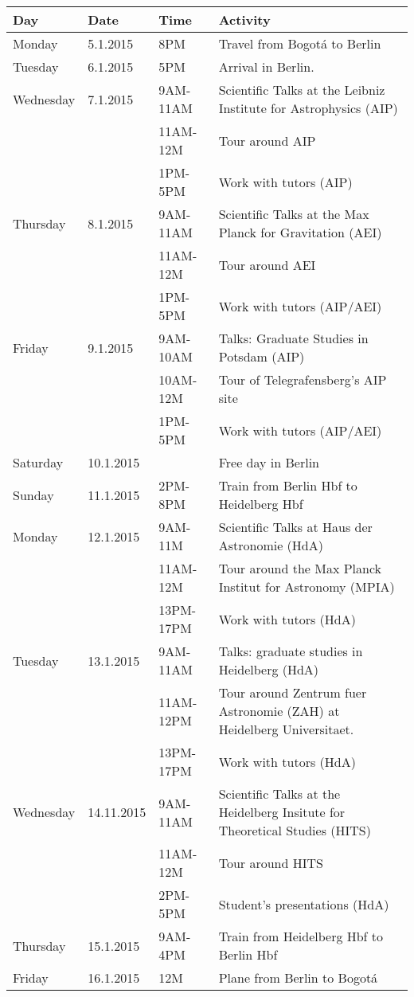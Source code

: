 \documentclass[12pt]{article}
\begin{document}
\begin{tabular}{p{2cm}p{2cm}p{2.5cm}p{7.0cm}}
Day & Date & Time & Activity\\\hline\hline

Monday & 5.1.2015 & 8PM&	Travel from Bogot\'a to Berlin\\\hline

Tuesday & 6.1.2015 & 5PM & Arrival in Berlin. \\\hline

Wednesday & 7.1.2015 & 9AM-11AM & Scientific Talks at the Leibniz Institute for Astrophysics (AIP)\\
 & & 11AM-12M &Tour around AIP\\
 & & 1PM-5PM & Work with tutors (AIP)\\\hline

Thursday &8.1.2015& 9AM-11AM &Scientific Talks at the Max Planck
for Gravitation (AEI)\\
 & & 11AM-12M &Tour around AEI\\
 & & 1PM-5PM & Work with tutors (AIP/AEI)\\\hline

Friday &9.1.2015 &  9AM-10AM & Talks: Graduate Studies in Potsdam (AIP)\\
& &  10AM-12M & Tour of Telegrafensberg's AIP site\\
& & 1PM-5PM& Work with tutors (AIP/AEI)\\ \hline

Saturday & 10.1.2015&  &	Free day in Berlin\\\hline

Sunday & 11.1.2015 & 2PM-8PM & Train from Berlin Hbf to Heidelberg Hbf\\\hline

Monday & 12.1.2015  & 9AM-11M & Scientific Talks at Haus der Astronomie (HdA)\\ 
&  & 11AM-12M  & Tour around the Max Planck Institut for Astronomy (MPIA)\\
 & & 13PM-17PM & Work with tutors (HdA)\\\hline

Tuesday &13.1.2015  & 9AM-11AM & Talks: graduate studies in Heidelberg (HdA)\\
& & 11AM-12PM & Tour around Zentrum fuer Astronomie (ZAH) at Heidelberg Universitaet.\\
 & & 13PM-17PM & Work with tutors (HdA)\\\hline

Wednesday &14.11.2015 & 9AM-11AM	& Scientific Talks at the Heidelberg
Insitute for Theoretical Studies (HITS) \\
&  & 11AM-12M  & Tour around HITS\\
& & 2PM-5PM  & Student's presentations (HdA)\\\hline

Thursday &15.1.2015& 9AM-4PM	& Train from Heidelberg Hbf to Berlin Hbf
\\\hline

Friday &16.1.2015&12M & Plane from Berlin to Bogot\'a \\\hline\hline


\end{tabular}
\end{document}
